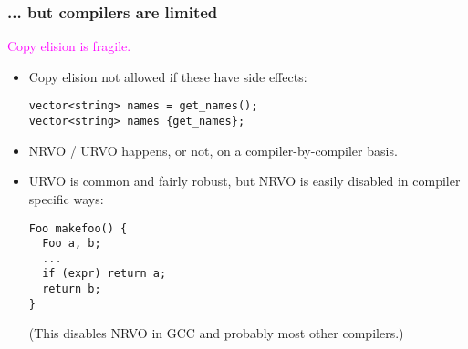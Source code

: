 \begin{frame}[fragile,t]
\frametitle{... but compilers are limited}

\textcolor{magenta}{Copy elision is fragile. %
}


\begin{itemize}
\item<1-> Copy elision not allowed if these have side effects:
{\scriptsize
\begin{verbatim}
vector<string> names = get_names();
vector<string> names {get_names};
\end{verbatim}
}

\item<2-> NRVO / URVO happens, or not, on a compiler-by-compiler
basis.
\item<3-> URVO is common and fairly robust, but NRVO is easily disabled in compiler specific ways:
{\scriptsize
\begin{verbatim}
Foo makefoo() {
  Foo a, b;
  ...
  if (expr) return a;
  return b;
}
\end{verbatim}
}
(This disables NRVO in GCC and probably most other compilers.)
\end{itemize}

\end{frame}

